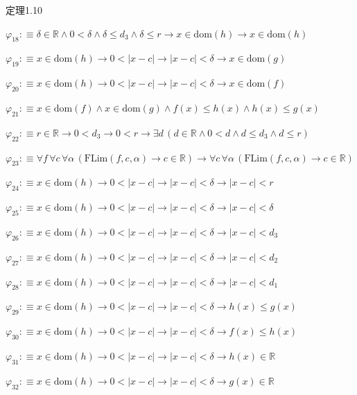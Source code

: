 \begin{fullproof}{定理1.10}
\begin{abbrevlist}
\item $\varphi_{18} :\equiv \delta \in \mathbb{R} \land 0 < \delta \land \delta \leq d_{3} \land \delta \leq r \to x \in \mathrm{dom}(h) \to x \in \mathrm{dom}(h)$
\item $\varphi_{19} :\equiv x \in \mathrm{dom}(h) \to 0 < \lvert x - c \rvert \to \lvert x - c \rvert < \delta \to x \in \mathrm{dom}(g)$
\item $\varphi_{20} :\equiv x \in \mathrm{dom}(h) \to 0 < \lvert x - c \rvert \to \lvert x - c \rvert < \delta \to x \in \mathrm{dom}(f)$
\item $\varphi_{21} :\equiv x \in \mathrm{dom}(f) \land x \in \mathrm{dom}(g) \land f(x) \leq h(x) \land h(x) \leq g(x)$
\item $\varphi_{22} :\equiv r \in \mathbb{R} \to 0 < d_{3} \to 0 < r \to \exists d\,(d \in \mathbb{R} \land 0 < d \land d \leq d_{3} \land d \leq r)$
\item $\varphi_{23} :\equiv \forall f\,\forall c\,\forall \alpha\,(\mathrm{FLim}(f,c,\alpha) \to c \in \mathbb{R}) \to \forall c\,\forall \alpha\,(\mathrm{FLim}(f,c,\alpha) \to c \in \mathbb{R})$
\item $\varphi_{24} :\equiv x \in \mathrm{dom}(h) \to 0 < \lvert x - c \rvert \to \lvert x - c \rvert < \delta \to \lvert x - c \rvert < r$
\item $\varphi_{25} :\equiv x \in \mathrm{dom}(h) \to 0 < \lvert x - c \rvert \to \lvert x - c \rvert < \delta \to \lvert x - c \rvert < \delta$
\item $\varphi_{26} :\equiv x \in \mathrm{dom}(h) \to 0 < \lvert x - c \rvert \to \lvert x - c \rvert < \delta \to \lvert x - c \rvert < d_{3}$
\item $\varphi_{27} :\equiv x \in \mathrm{dom}(h) \to 0 < \lvert x - c \rvert \to \lvert x - c \rvert < \delta \to \lvert x - c \rvert < d_{2}$
\item $\varphi_{28} :\equiv x \in \mathrm{dom}(h) \to 0 < \lvert x - c \rvert \to \lvert x - c \rvert < \delta \to \lvert x - c \rvert < d_{1}$
\item $\varphi_{29} :\equiv x \in \mathrm{dom}(h) \to 0 < \lvert x - c \rvert \to \lvert x - c \rvert < \delta \to h(x) \leq g(x)$
\item $\varphi_{30} :\equiv x \in \mathrm{dom}(h) \to 0 < \lvert x - c \rvert \to \lvert x - c \rvert < \delta \to f(x) \leq h(x)$
\item $\varphi_{31} :\equiv x \in \mathrm{dom}(h) \to 0 < \lvert x - c \rvert \to \lvert x - c \rvert < \delta \to h(x) \in \mathbb{R}$
\item $\varphi_{32} :\equiv x \in \mathrm{dom}(h) \to 0 < \lvert x - c \rvert \to \lvert x - c \rvert < \delta \to g(x) \in \mathbb{R}$

\end{abbrevlist}
\end{fullproof}
